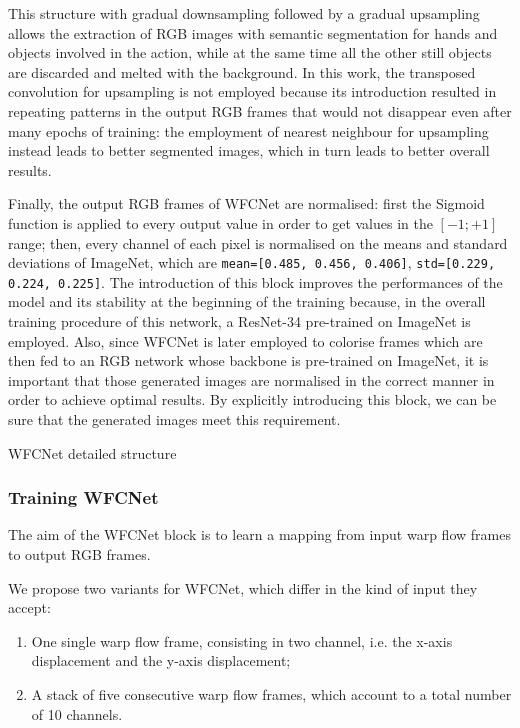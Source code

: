 \documentclass[10pt,twocolumn,letterpaper]{article}
\begin{document}
This structure with gradual downsampling followed by a gradual upsampling allows the extraction of RGB images with semantic segmentation for hands and objects involved in the action, while at the same time all the other still objects are discarded and melted with the background. In this work, the transposed convolution for upsampling is not employed because its introduction resulted in repeating patterns in the output RGB frames that would not disappear even after many epochs of training: the employment of nearest neighbour for upsampling instead leads to better segmented images, which in turn leads to better overall results.

Finally, the output RGB frames of WFCNet are normalised: first the Sigmoid function is applied to every output value in order to get values in the $[-1; +1]$ range; then, every channel of each pixel is normalised on the means and standard deviations of ImageNet, which are \texttt{mean=[0.485, 0.456, 0.406]}, \texttt{std=[0.229, 0.224, 0.225]}. The introduction of this block improves the performances of the model and its stability at the beginning of the training because, in the overall training procedure of this network, a ResNet-34 pre-trained on ImageNet is employed. Also, since WFCNet is later employed to colorise frames which are then fed to an RGB network whose backbone is pre-trained on ImageNet, it is important that those generated images are normalised in the correct manner in order to achieve optimal results. By explicitly introducing this block, we can be sure that the generated images meet this requirement.

\begin{table}
	
	\vspace{5mm}
	\label{tab:wfcnet}
	\caption{WFCNet detailed structure}
\end{table}

\subsubsection{Training WFCNet}
\label{par:TrainingWFCNet}

The aim of the WFCNet block is to learn a mapping from input warp flow frames to output RGB frames.

We propose two variants for WFCNet, which differ in the kind of input they accept:
\begin{enumerate}
	\item One single warp flow frame, consisting in two channel, i.e. the x-axis displacement and the y-axis displacement;
	\item A stack of five consecutive warp flow frames, which account to a total number of 10 channels.
\end{enumerate}
\end{document}
